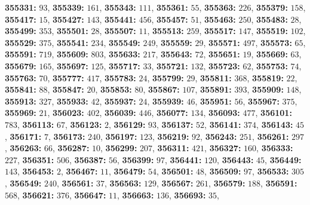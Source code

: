 \textsf{\bfseries 355331:} $93$, \textsf{\bfseries 355339:} $161$, \textsf{\bfseries 355343:} $111$, \textsf{\bfseries 355361:} $55$, \textsf{\bfseries 355363:} $226$, \textsf{\bfseries 355379:} $158$, \textsf{\bfseries 355417:} $15$, \textsf{\bfseries 355427:} $143$, \textsf{\bfseries 355441:} $456$, \textsf{\bfseries 355457:} $51$, \textsf{\bfseries 355463:} $250$, \textsf{\bfseries 355483:} $28$, \textsf{\bfseries 355499:} $353$, \textsf{\bfseries 355501:} $28$, \textsf{\bfseries 355507:} $11$, \textsf{\bfseries 355513:} $259$, \textsf{\bfseries 355517:} $147$, \textsf{\bfseries 355519:} $102$, \textsf{\bfseries 355529:} $375$, \textsf{\bfseries 355541:} $234$, \textsf{\bfseries 355549:} $249$, \textsf{\bfseries 355559:} $29$, \textsf{\bfseries 355571:} $497$, \textsf{\bfseries 355573:} $65$, \textsf{\bfseries 355591:} $719$, \textsf{\bfseries 355609:} $803$, \textsf{\bfseries 355633:} $217$, \textsf{\bfseries 355643:} $72$, \textsf{\bfseries 355651:} $19$, \textsf{\bfseries 355669:} $63$, \textsf{\bfseries 355679:} $165$, \textsf{\bfseries 355697:} $125$, \textsf{\bfseries 355717:} $33$, \textsf{\bfseries 355721:} $132$, \textsf{\bfseries 355723:} $62$, \textsf{\bfseries 355753:} $74$, \textsf{\bfseries 355763:} $70$, \textsf{\bfseries 355777:} $417$, \textsf{\bfseries 355783:} $24$, \textsf{\bfseries 355799:} $29$, \textsf{\bfseries 355811:} $368$, \textsf{\bfseries 355819:} $22$, \textsf{\bfseries 355841:} $88$, \textsf{\bfseries 355847:} $20$, \textsf{\bfseries 355853:} $80$, \textsf{\bfseries 355867:} $107$, \textsf{\bfseries 355891:} $393$, \textsf{\bfseries 355909:} $148$, \textsf{\bfseries 355913:} $327$, \textsf{\bfseries 355933:} $42$, \textsf{\bfseries 355937:} $24$, \textsf{\bfseries 355939:} $46$, \textsf{\bfseries 355951:} $56$, \textsf{\bfseries 355967:} $375$, \textsf{\bfseries 355969:} $21$, \textsf{\bfseries 356023:} $402$, \textsf{\bfseries 356039:} $446$, \textsf{\bfseries 356077:} $134$, \textsf{\bfseries 356093:} $477$, \textsf{\bfseries 356101:} $783$, \textsf{\bfseries 356113:} $67$, \textsf{\bfseries 356123:} $2$, \textsf{\bfseries 356129:} $93$, \textsf{\bfseries 356137:} $52$, \textsf{\bfseries 356141:} $374$, \textsf{\bfseries 356143:} $45$, \textsf{\bfseries 356171:} $7$, \textsf{\bfseries 356173:} $240$, \textsf{\bfseries 356197:} $123$, \textsf{\bfseries 356219:} $92$, \textsf{\bfseries 356243:} $251$, \textsf{\bfseries 356261:} $297$, \textsf{\bfseries 356263:} $66$, \textsf{\bfseries 356287:} $10$, \textsf{\bfseries 356299:} $207$, \textsf{\bfseries 356311:} $421$, \textsf{\bfseries 356327:} $160$, \textsf{\bfseries 356333:} $227$, \textsf{\bfseries 356351:} $506$, \textsf{\bfseries 356387:} $56$, \textsf{\bfseries 356399:} $97$, \textsf{\bfseries 356441:} $120$, \textsf{\bfseries 356443:} $45$, \textsf{\bfseries 356449:} $143$, \textsf{\bfseries 356453:} $2$, \textsf{\bfseries 356467:} $11$, \textsf{\bfseries 356479:} $54$, \textsf{\bfseries 356501:} $48$, \textsf{\bfseries 356509:} $97$, \textsf{\bfseries 356533:} $305$, \textsf{\bfseries 356549:} $240$, \textsf{\bfseries 356561:} $37$, \textsf{\bfseries 356563:} $129$, \textsf{\bfseries 356567:} $261$, \textsf{\bfseries 356579:} $188$, \textsf{\bfseries 356591:} $568$, \textsf{\bfseries 356621:} $376$, \textsf{\bfseries 356647:} $11$, \textsf{\bfseries 356663:} $136$, \textsf{\bfseries 356693:} $35$, 
